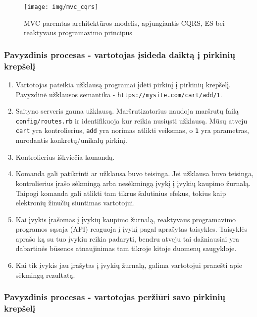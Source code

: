 \begin{figure}[H]
    \centering
    \texttt{[image: img/mvc\_cqrs]}
    \caption{MVC paremtas architektūros modelis, apjungiantis CQRS, ES bei reaktyvaus programavimo principus}
    \label{img:mvc_cqrs}
\end{figure}

\subsubsection{Pavyzdinis procesas - vartotojas įsideda daiktą į pirkinių krepšelį}

\begin{enumerate}
  \item Vartotojas pateikia užklausą programai įdėti pirkinį į pirkinių krepšelį. Pavyzdinė užklausos semantika - \lstinline|https://mysite.com/cart/add/1|.

  \item Saityno serveris gauna užklausą. Maršrutizatorius naudoja maršrutų failą \lstinline|config/routes.rb| ir identifikuoja kur reikia nusiųsti užklausą. Mūsų atveju \lstinline|cart| yra kontrolierius, \lstinline|add| yra norimas atlikti veiksmas, o \lstinline|1| yra parametras, nurodantis konkretų/unikalų pirkinį.

  \item Kontrolierius iškviečia komandą.

  \item Komanda gali patikrinti ar užklausa buvo teisinga. Jei užklausa buvo teisinga, kontrolierius įrašo sėkmingą arba nesėkmingą įvykį į įvykių kaupimo žurnalą. Taipogi komanda gali atlikti tam tikrus šalutinius efekus, tokius kaip elektronių žinučių siuntimas vartotojui.

  \item Kai įvykis įrašomas į įvykių kaupimo žurnalą, reaktyvaus programavimo programos sąsaja (API) reaguoja į įvykį pagal aprašytas taisykles. Taisyklės aprašo ką su tuo įvykiu reikia padaryti, bendru atveju tai dažniausiai yra dabartinės būsenos atnaujinimas tam tikroje kitoje duomenų saugykloje.

  \item Kai tik įvykis jau įrašytas į įvykių žurnalą, galima vartotojui pranešti apie sėkmingą rezultatą.
\end{enumerate}

\subsubsection{Pavyzdinis procesas - vartotojas peržiūri savo pirkinių krepšelį}

